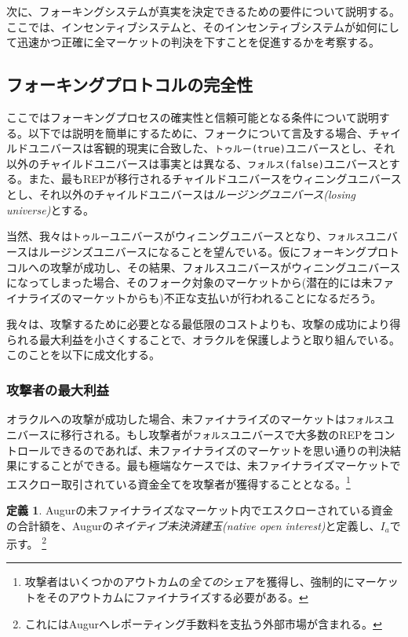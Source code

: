 \documentclass[floatfix,reprint,nofootinbib,amsmath,amssymb,epsfig,pre,floats,letterpaper,groupedaffiliation]{revtex4-1}
\theoremstyle{definition}
\theoremstyle{definition}
\newtheorem{definition}{定義}
\theoremstyle{definition}
\begin{document}
次に、フォーキングシステムが真実を決定できるための要件について説明する。ここでは、インセンティブシステムと、そのインセンティブシステムが如何にして迅速かつ正確に全マーケットの判決を下すことを促進するかを考察する。

\subsection{フォーキングプロトコルの完全性}\label{section:integrity_forking_protocol}

ここではフォーキングプロセスの確実性と信頼可能となる条件について説明する。以下では説明を簡単にするために、フォークについて言及する場合、チャイルドユニバースは客観的現実に合致した、\texttt{トゥルー(true)}ユニバースとし、それ以外のチャイルドユニバースは事実とは異なる、\texttt{フォルス(false)}ユニバースとする。また、最もREPが移行されるチャイルドユニバースをウィニングユニバースとし、それ以外のチャイルドユニバースは\textit{ルージングユニバース(losing universe)}とする。

当然、我々は\texttt{トゥルー}ユニバースがウィニングユニバースとなり、\texttt{フォルス}ユニバースはルージンズユニバースになることを望んでいる。仮にフォーキングプロトコルへの攻撃が成功し、その結果、フォルスユニバースがウィニングユニバースになってしまった場合、そのフォーク対象のマーケットから(潜在的には未ファイナライズのマーケットからも)不正な支払いが行われることになるだろう。

我々は、攻撃するために必要となる最低限のコストよりも、攻撃の成功により得られる最大利益を小さくすることで、オラクルを保護しようと取り組んでいる。このことを以下に成文化する。

\subsubsection{攻撃者の最大利益}

オラクルへの攻撃が成功した場合、未ファイナライズのマーケットは\texttt{フォルス}ユニバースに移行される。もし攻撃者が\texttt{フォルス}ユニバースで大多数のREPをコントロールできるのであれば、未ファイナライズのマーケットを思い通りの判決結果にすることができる。最も極端なケースでは、未ファイナライズマーケットでエスクロー取引されている資金全てを攻撃者が獲得することとなる。\footnote{攻撃者はいくつかのアウトカムの\textit{全ての}シェアを獲得し、強制的にマーケットをそのアウトカムにファイナライズする必要がある。}

\begin{definition}
Augurの未ファイナライズなマーケット内でエスクローされている資金の合計額を、Augurの\textit{ネイティブ未決済建玉(native open interest)}と定義し、$I_a$で示す。 \footnote{これにはAugurへレポーティング手数料を支払う外部市場が含まれる。}
\end{definition}
\end{document}
